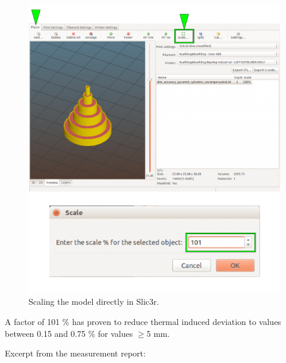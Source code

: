 \begin{figure}[H]
  \centering
  \includegraphics[width=.7\linewidth]{./img/slic3r_upscale.png}
  \caption{Scaling the model directly in Slic3r.}
\end{figure}

A factor of 101 \% has proven to reduce thermal induced deviation to values between 0.15 and 0.75 \% for values $\geq$5 mm. 


Excerpt from the measurement report: 

